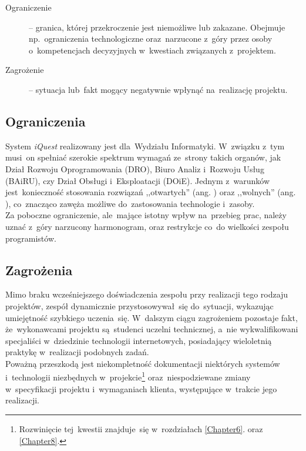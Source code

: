 \begin{description}
\item[Ograniczenie] -- granica, której przekroczenie jest niemożliwe lub zakazane. Obejmuje np.~ograniczenia technologiczne oraz~narzucone z~góry przez osoby o~kompetencjach decyzyjnych w~kwestiach związanych z~projektem.
\item[Zagrożenie] -- sytuacja lub~fakt mogący negatywnie wpłynąć na~realizację projektu.
\end{description}

\subsection{Ograniczenia}
\label{Chapter121}

System \textit{iQuest} realizowany jest dla~Wydziału Informatyki. W~związku z~tym musi~on spełniać szerokie spektrum wymagań ze~strony takich organów, jak Dział Rozwoju Oprogramowania (DRO), Biuro Analiz i~Rozwoju Usług (BAiRU), czy Dział Obsługi i~Eksploatacji (DOiE). Jednym z~warunków jest~konieczność stosowania rozwiązań ,,otwartych'' (ang. ) oraz ,,wolnych'' (ang. ), co~znacząco zawęża możliwe do~zastosowania technologie i~zasoby. \\

Za poboczne ograniczenie, ale~mające istotny wpływ na~przebieg prac, należy uznać z~góry narzucony harmonogram, oraz restrykcje co~do wielkości zespołu programistów.

\subsection{Zagrożenia}
\label{Chapter122}

Mimo braku wcześniejszego doświadczenia zespołu przy realizacji tego rodzaju projektów, zespół dynamicznie przystosowywał~się do~sytuacji, wykazując umiejętność szybkiego uczenia~się. W~dalszym ciągu zagrożeniem pozostaje fakt, że~wykonawcami projektu są~studenci uczelni technicznej, a~nie wykwalifikowani specjaliści w~dziedzinie technologii internetowych, posiadający wieloletnią praktykę w~realizacji podobnych zadań. \\

Poważną przeszkodą jest niekompletność dokumentacji niektórych systemów i~technologii niezbędnych w~projekcie\footnote{Rozwinięcie tej~kwestii znajduje~się w~rozdziałach \ref{Chapter6}. oraz \ref{Chapter8}.} oraz~niespodziewane zmiany w~specyfikacji projektu i~wymaganiach klienta, występujące w~trakcie jego realizacji.

